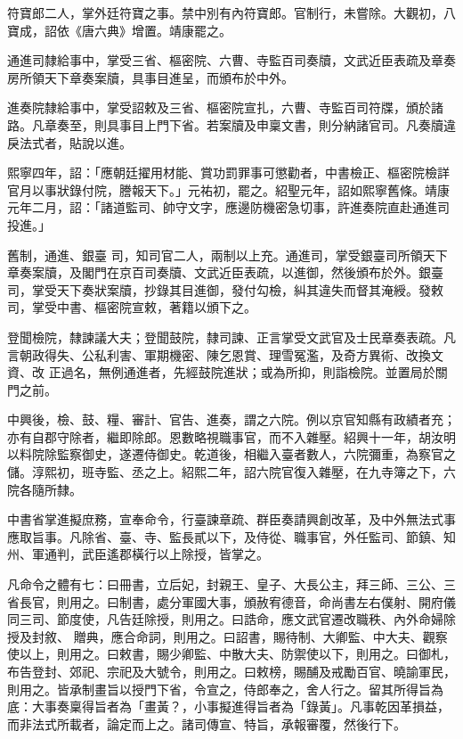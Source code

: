 \begin{pinyinscope}
 符寶郎二人，掌外廷符寶之事。禁中別有內符寶郎。官制行，未嘗除。大觀初，八寶成，詔依《唐六典》增置。靖康罷之。



 通進司隸給事中，掌受三省、樞密院、六曹、寺監百司奏牘，文武近臣表疏及章奏房所領天下章奏案牘，具事目進呈，而頒布於中外。



 進奏院隸給事中，掌受詔敕及三省、樞密院宣扎，六曹、寺監百司符牒，頒於諸路。凡章奏至，則具事目上門下省。若案牘及申稟文書，則分納諸官司。凡奏牘違戾法式者，貼說以進。



 熙寧四年，詔：「應朝廷擢用材能、賞功罰罪事可懲勸者，中書檢正、樞密院檢詳官月以事狀錄付院，謄報天下。」元祐初，罷之。紹聖元年，詔如熙寧舊條。靖康元年二月，詔：「諸道監司、帥守文字，應邊防機密急切事，許進奏院直赴通進司投進。」



 舊制，通進、銀臺
 司，知司官二人，兩制以上充。通進司，掌受銀臺司所領天下章奏案牘，及閣門在京百司奏牘、文武近臣表疏，以進御，然後頒布於外。銀臺司，掌受天下奏狀案牘，抄錄其目進御，發付勾檢，糾其違失而督其淹綬。發敕司，掌受中書、樞密院宣敕，著籍以頒下之。



 登聞檢院，隸諫議大夫；登聞鼓院，隸司諫、正言掌受文武官及士民章奏表疏。凡言朝政得失、公私利害、軍期機密、陳乞恩賞、理雪冤濫，及奇方異術、改換文資、改
 正過名，無例通進者，先經鼓院進狀；或為所抑，則詣檢院。並置局於關門之前。



 中興後，檢、鼓、糧、審計、官告、進奏，謂之六院。例以京官知縣有政績者充；亦有自郡守除者，繼即除郎。恩數略視職事官，而不入雜壓。紹興十一年，胡汝明以料院除監察御史，遂遷侍御史。乾道後，相繼入臺者數人，六院彌重，為察官之儲。淳熙初，班寺監、丞之上。紹熙二年，詔六院官復入雜壓，在九寺簿之下，六院各隨所隸。



 中書省掌進擬庶務，宣奉命令，行臺諫章疏、群臣奏請興創改革，及中外無法式事應取旨事。凡除省、臺、寺、監長貳以下，及侍從、職事官，外任監司、節鎮、知州、軍通判，武臣遙郡橫行以上除授，皆掌之。



 凡命令之體有七：曰冊書，立后妃，封親王、皇子、大長公主，拜三師、三公、三省長官，則用之。曰制書，處分軍國大事，頒赦宥德音，命尚書左右僕射、開府儀同三司、節度使，凡告廷除授，則用之。曰誥命，應文武官遷改職秩、內外命婦除授及封敘、
 贈典，應合命詞，則用之。曰詔書，賜待制、大卿監、中大夫、觀察使以上，則用之。曰敕書，賜少卿監、中散大夫、防禦使以下，則用之。曰御札，布告登封、郊祀、宗祀及大號令，則用之。曰敕榜，賜酺及戒勵百官、曉諭軍民，則用之。皆承制畫旨以授門下省，令宣之，侍郎奉之，舍人行之。留其所得旨為底：大事奏稟得旨者為「畫黃？，小事擬進得旨者為「錄黃」。凡事乾因革損益，而非法式所載者，論定而上之。諸司傳宣、特旨，承報審覆，然後行下。




\end{pinyinscope}
